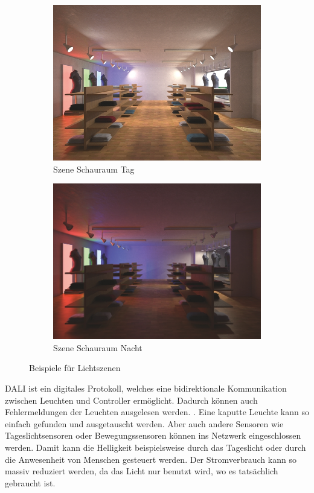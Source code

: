 \begin{figure}[H]
	\centering
	\begin{subfigure}{.5\textwidth}
		\centering
		\includegraphics[width=.6\linewidth]{Pictures/DaliSchauraumTag}
		\caption{Szene Schauraum Tag}
	\end{subfigure}%
	\begin{subfigure}{.5\textwidth}
		\centering
		\includegraphics[width=.6\linewidth]{Pictures/DaliSchauraumNacht}
		\caption{Szene Schauraum Nacht}
	\end{subfigure}
	\caption{Beispiele für Lichtszenen \cite[p.6]{DALI_Handbuch}}
	\label{fig:dali_scenes}
\end{figure}

DALI ist ein digitales Protokoll, welches eine bidirektionale Kommunikation zwischen Leuchten und Controller ermöglicht. Dadurch können auch Fehlermeldungen der Leuchten ausgelesen werden. \cite[p. 1]{DALI-Lichtmanagement}. Eine kaputte Leuchte kann so einfach gefunden und ausgetauscht werden.  Aber auch andere Sensoren wie Tageslichtsensoren oder Bewegungssensoren können ins Netzwerk eingeschlossen werden. Damit kann die Helligkeit beispielsweise durch das Tageslicht oder durch die Anwesenheit von Menschen gesteuert werden. Der Stromverbrauch kann so massiv reduziert werden, da das Licht nur benutzt wird, wo es tatsächlich gebraucht ist.

